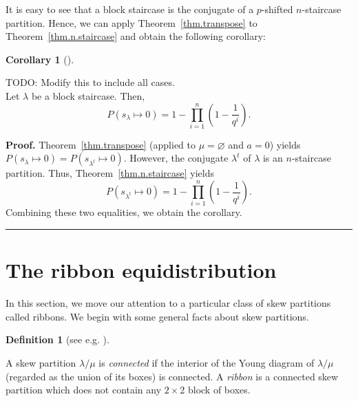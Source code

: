 \documentclass[numbers=enddot,12pt,final,onecolumn,notitlepage]{scrartcl}%
\theoremstyle{definition}
\newtheorem{defi}[theo]{Definition}
\newenvironment{definition}[1][]
{\begin{defi}[#1]\begin{leftbar}}
{\end{leftbar}\end{defi}}
\newtheorem{coro}[theo]{Corollary}
\newenvironment{corollary}[1][]
{\begin{coro}[#1]\begin{leftbar}}
{\end{leftbar}\end{coro}}
\newtheorem{exam}[theo]{Example}
\newenvironment{example}[1][]
{\begin{exam}[#1]\begin{leftbar}}
{\end{leftbar}\end{exam}}
\newenvironment{proof}[1][Proof]{\noindent\textbf{#1.} }{\ \rule{0.5em}{0.5em}}
\let\prodnonlimits\prod
\renewcommand{\prod}{\prodnonlimits\limits}
\theoremstyle{plainsl}
\begin{document}
It is easy to see that a block staircase is the conjugate of a $p$-shifted $n$-staircase partition.
Hence, we can apply Theorem~\ref{thm.transpose} to Theorem~\ref{thm.n.staircase}
and obtain the following corollary:

\begin{corollary}
TODO: Modify this to include all cases.\\

Let $\lambda$ be a block staircase. Then,
\[
P(s_{\lambda} \longmapsto 0) = 1-\prod_{i=1}^{n} \left(  1-\dfrac{1}{q^{i}}\right) .
\]
\end{corollary}

\begin{proof}
Theorem~\ref{thm.transpose} (applied to $\mu = \varnothing$
and $a = 0$) yields
$P\left(  s_{\lambda}\mapsto 0\right)
=P\left(  s_{\lambda^{t}}\mapsto 0\right)$.
However, the conjugate $\lambda^t$ of $\lambda$ is an $n$-staircase partition.
Thus, Theorem~\ref{thm.n.staircase}
yields
\[
P(s_{\lambda^t} \longmapsto 0) = 1-\prod_{i=1}^{n} \left(  1-\dfrac{1}{q^{i}}\right) .
\]
Combining these two equalities, we obtain the corollary.
\end{proof}

\section{The ribbon equidistribution}

In this section, we move our attention to a particular class of skew partitions called ribbons. We begin with some general facts about skew partitions.

\begin{definition}[see e.g. {\cite[\S7.17]{EC2}}]

A skew partition $\lambda/\mu$ is \emph{connected} if the interior of the Young diagram of $\lambda/\mu$ (regarded as the union of its boxes) is connected.
A \emph{ribbon} is a connected skew partition which does not contain any $2 \times 2$ block of boxes. 

\end{definition}


\end{document}
